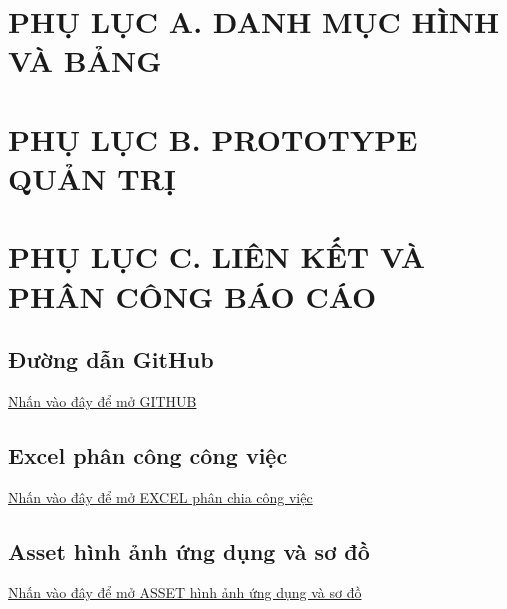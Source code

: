 \clearpage
\pagestyle{plain}
\section*{PHỤ LỤC A. DANH MỤC HÌNH VÀ BẢNG}
\printappendixfigures
\medskip
\printappendixtables

\clearpage
\section*{PHỤ LỤC B. PROTOTYPE QUẢN TRỊ}
\setcounter{figure}{0}


\clearpage
\section*{PHỤ LỤC C. LIÊN KẾT VÀ PHÂN CÔNG BÁO CÁO}
\label{app:project-resources}
\setcounter{table}{0}\renewcommand{\thetable}{C.\arabic{table}}
\subsection*{Đường dẫn GitHub}
\begin{center}
\href{https://github.com/phuclu3123/GROUP_MOBILE_BROOMSHARING.git}{\textcolor{uehblue}{\faGithub\hspace{0.25cm}Nhấn vào đây để mở GITHUB}}
\end{center}

\subsection*{Excel phân công công việc}
\begin{center}
\href{https://drive.google.com/file/d/1QgZXFG2qhMrYj7dkOfLZZZsQbiwZeeLu/view?usp=drive_link}{\textcolor{uehblue}{\faFileExcel\hspace{0.25cm}Nhấn vào đây để mở EXCEL phân chia công việc}}
\end{center}

\subsection*{Asset hình ảnh ứng dụng và sơ đồ}
\begin{center}
\href{https://drive.google.com/drive/folders/17oHiO-325_xpyVXmavMDbLrI7sBT2iks?usp=drive_link}{\textcolor{uehblue}{\faImages\hspace{0.25cm}Nhấn vào đây để mở ASSET hình ảnh ứng dụng và sơ đồ}}
\end{center}


